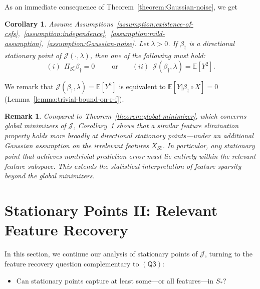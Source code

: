 \documentclass[sn-mathphys-num]{sn-jnl}%
\numberwithin{equation}{section}
\newcommand{\E}{\mathbb{E}}
\newtheorem{corollary}{Corollary}
\theoremstyle{thmstyleone}%
\theoremstyle{thmstyletwo}%
\newtheorem{remark}{Remark}%
\theoremstyle{thmstylethree}%
\begin{document}
\vspace{.5em} 
As an immediate consequence of Theorem~\ref{theorem:Gaussian-noise}, we get
\vspace{.5em} 
\begin{corollary}
\label{corollary:elimination-at-stationary-points}
Assume Assumptions~\ref{assumption:existence-of-csfs},~\ref{assumption:independence},~\ref{assumption:mild-assumption},~\ref{assumption:Gaussian-noise}. 
Let $\lambda > 0$.
If $\beta_\dagger$ is a directional stationary point of $\mathcal{J}(\cdot, \lambda)$, then one of the following must hold: 
\begin{equation*}
	(i)~~\Pi_{S_*^c}  \beta_\dagger = 0~~\qquad \text{or} \qquad 
	(ii)~~\mathcal{J}(\beta_\dagger, \lambda) = \E[Y^2]. 
\end{equation*}
\end{corollary} 

We remark that $\mathcal{J}(\beta_\dagger, \lambda) = \E[Y^2]$ is equivalent to 
$\E[Y|\beta_\dagger \circ X]= 0$ (Lemma~\ref{lemma:trivial-bound-on-r-f}). 


\vspace{1em} 
\begin{remark}%
\emph{
Compared to Theorem~\ref{theorem:global-minimizer}, which concerns global minimizers of $\mathcal{J}$, Corollary~\ref{corollary:elimination-at-stationary-points} shows that a similar feature elimination property holds more broadly at directional stationary points---under an additional Gaussian assumption on the irrelevant features $X_{S_*^c}$. In particular, any stationary point that achieves nontrivial prediction error must lie entirely within the relevant feature subspace. This extends the statistical interpretation of feature sparsity beyond the global minimizers.
}
\end{remark}



\section{Stationary Points II: Relevant Feature Recovery} 
\label{sec:stationary-points-and-relevant-feature-recovery} 
In this section, we continue our analysis of stationary points of $\mathcal{J}$, turning to the feature recovery question complementary to $(\mathsf{Q3})$:
\vspace{.5em}
\begin{itemize}
\item[($\mathsf{Q4}$)] Can stationary points capture at least some---or all features---in $S_*$? 
\end{itemize} 
\end{document}
